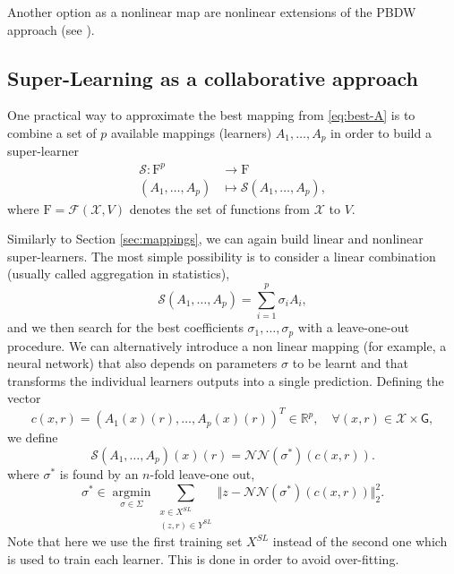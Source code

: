 \documentclass[11pt,a4paper,twoside]{article}
\theoremstyle{definition}
\numberwithin{equation}{section}
\newcommand{\cF}{\ensuremath{\mathcal{F}}}
\newcommand{\cS}{\ensuremath{\mathcal{S}}}
\newcommand{\cX}{\ensuremath{\mathcal{X}}}
\newcommand{\bR}{\ensuremath{\mathbb{R}}}
\newcommand{\rF}{\ensuremath{\mathrm{F}}}
\newcommand{\G}{\ensuremath{\textsf{G}}} %
\newcommand{\<}{\langle}
\renewcommand{\>}{\rangle}
\newcommand{\argmin}{\operatorname{argmin}}
\newcommand{\asmodif}[2]{{\color{teal} #1} {\sout{#2}}}
\begin{document}
Another option as a nonlinear map are nonlinear extensions of the PBDW approach (see \cite{CDMN2022,CDMS2022}).

\subsection{Super-Learning as a collaborative approach}
\label{sec:super-learning}

One practical way to approximate the best mapping from \eqref{eq:best-A} is to combine a set of $p$ available mappings (learners) $A_1, \dots, A_p$ in order to build a super-learner
\begin{align}
\cS: \rF^p &\to \rF \\
( A_1, \dots, A_p) &\mapsto \cS(A_1, \dots, A_p),
\end{align}
where $\rF = \cF(\cX, V)$ denotes the set of functions from $\cX$ to $V$.

Similarly to Section \ref{sec:mappings}, we can again build linear and nonlinear super-learners. The most simple possibility is to consider a linear combination (usually called aggregation in statistics),
$$
\cS(A_1, \dots, A_p) = \sum_{i=1}^p \sigma_i A_i,
$$
and we then search for the best coefficients $\sigma_1, \dots, \sigma_p$ with a leave-one-out procedure. We can alternatively introduce a non linear mapping (for example, a neural network) that also depends on parameters $\sigma$ to be learnt and that transforms the individual learners outputs into a single prediction. Defining the vector
$$
c(x, r) = ( A_1(x)(r), \dots, A_p(x)(r) )^T \in \bR^p, \quad \forall (x,r)\in \cX\times \G,
$$
we define
$$
\cS(A_1, \dots, A_p)(x)(r) =  \mathcal{NN} (\sigma^*)( c(x,r) ). 
$$
where $\sigma^*$ is found by an $n$-fold leave-one out,
\asmodif{
$$
\sigma^* \in \underset{\sigma \in \Sigma}{\argmin}
\sum_{\substack{x\in X^{SL} \\ (z, r)\in Y^{SL}}}
\Vert z -  \mathcal{NN} (\sigma^*)( c(x,r) ) \Vert^2_2.
$$
Note that here we use the first training set $X^{SL}$ instead of the second one which is used to train each learner.}{} This is done in order to avoid over-fitting.

\end{document}
